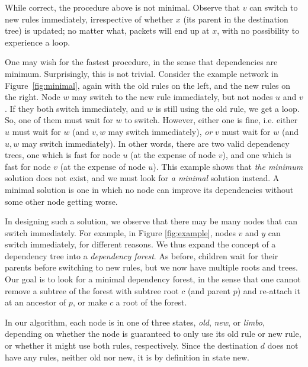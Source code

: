 While correct, the procedure above is not minimal. Observe that $v$ can switch to new rules immediately, irrespective of whether $x$ (its parent in the destination tree) is updated; no matter what, packets will end up at $x$, with no possibility to experience a loop.

One may wish for the fastest procedure, in the sense that dependencies are minimum. Surprisingly, this is not trivial. Consider the example network in Figure~\ref{fig:minimal}, again with the old rules on the left, and the new rules on the right. Node $w$ may switch to the new rule immediately, but not nodes $u$ and $v$. If they both switch immediately, and $w$ is still using the old rule, we get a loop. So, one of them must wait for $w$ to switch. However, either one is fine, i.e. either $u$ must wait for $w$ (and $v,w$ may switch immediately), \emph{or} $v$ must wait for $w$ (and $u,w$ may switch immediately). In other words, there are two valid dependency trees, one which is fast for node $u$ (at the expense of node $v$), and one which is fast for node $v$ (at the expense of node $u$).
This example shows that \emph{the minimum} solution does not exist, and we must look for \emph{a minimal} solution instead. A minimal solution is one in which no node can improve its dependencies without some other node getting worse.

In designing such a solution, we observe that there may be many nodes that can switch immediately. For example, in Figure \ref{fig:example}, nodes $v$ and $y$ can switch immediately, for different reasons. We thus expand the concept of a dependency tree into a \emph{dependency forest}. As before, children wait for their parents before switching to new rules, but we now have multiple roots and trees. Our goal is to look for a minimal dependency forest, in the sense that one cannot remove a subtree of the forest with subtree root $c$ (and parent $p$) and re-attach it at an ancestor of $p$, or make $c$ a root of the forest.

In our algorithm, each node is in one of three states, \emph{old}, \emph{new}, or \emph{limbo}, depending on whether the node is guaranteed to only use its old rule or new rule, or whether it might use both rules, respectively. Since the destination $d$ does not have any rules, neither old nor new, it is by definition in state new.

